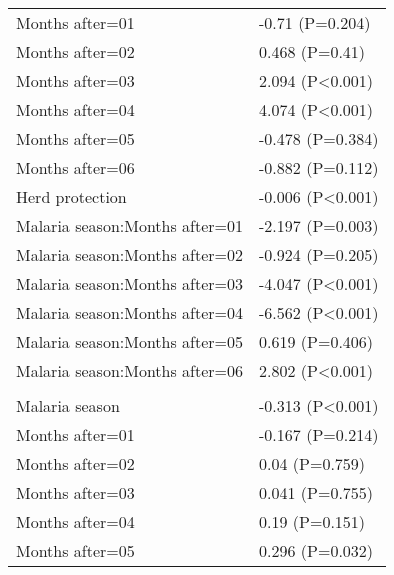 \documentclass[]{article}
\begin{document}
\begin{longtable}[t]{ll}
\hspace{1em}Months after=01 & -0.71 (P=0.204)\\
\hspace{1em}Months after=02 & 0.468 (P=0.41)\\
\hspace{1em}Months after=03 & 2.094 (P<0.001)\\
\hspace{1em}Months after=04 & 4.074 (P<0.001)\\
\hspace{1em}Months after=05 & -0.478 (P=0.384)\\
\hspace{1em}Months after=06 & -0.882 (P=0.112)\\
\hspace{1em}Herd protection & -0.006 (P<0.001)\\
\hspace{1em}Malaria season:Months after=01 & -2.197 (P=0.003)\\
\hspace{1em}Malaria season:Months after=02 & -0.924 (P=0.205)\\
\hspace{1em}Malaria season:Months after=03 & -4.047 (P<0.001)\\
\hspace{1em}Malaria season:Months after=04 & -6.562 (P<0.001)\\
\hspace{1em}Malaria season:Months after=05 & 0.619 (P=0.406)\\
\hspace{1em}Malaria season:Months after=06 & 2.802 (P<0.001)\\
\addlinespace[1.5em]
\multicolumn{2}{l}{\textbf{Temporary field worker}}\\
\hspace{1em}Malaria season & -0.313 (P<0.001)\\
\hspace{1em}Months after=01 & -0.167 (P=0.214)\\
\hspace{1em}Months after=02 & 0.04 (P=0.759)\\
\hspace{1em}Months after=03 & 0.041 (P=0.755)\\
\hspace{1em}Months after=04 & 0.19 (P=0.151)\\
\hspace{1em}Months after=05 & 0.296 (P=0.032)\\

\end{longtable}
\end{document}
